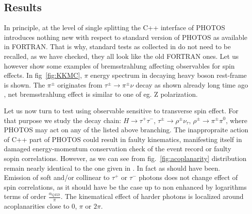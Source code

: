 \documentclass[]{Photos_interface_design}
\begin{document}
\subsection{Results}
In principle, at the level of single splitting the C++ interface of PHOTOS
introduces nothing new with respect to standard version of PHOTOS as available 
in FORTRAN. That is why, standard tests as collected in \cite{Photos_tests} do not need 
to be recalled, as we have checked, they all look like the old FORTRAN ones.
Let us however show some examples of bremsstrahlung affecting observables
for spin effects. In  fig~\ref{fig:KKMC}, $\pi$ energy spectrum in decaying
heavy boson rest-frame is shown. The $\pi^\pm$ originates from $\tau^\pm \to \pi^\pm \nu $ decay as shown already long time ago \cite{Boillot:1988re}, net
bremsstrahlung  effect is similar 
to one of eg. Z polarization.

Let us now turn to test using observable sensitive to transverse spin effect.
 For that purpose we study the decay chain:
$H\to \tau^+\tau^-$, $\tau^\pm \to \rho^\pm \nu_\tau$, 
$\rho^\pm \to \pi^\pm \pi^0$, where PHOTOS may act on any of the listed above branching. The inappropraite action of C++ part of PHOTOS could result in faulty
kinematics, manifesting itself in damaged energy-momentum conservation check of the event record or faulty sopin correlations. However, as we can see from 
fig.~\ref{fig:acoplanarity} distribution remain nearly identical to the 
one given in \cite{tauolaC++}. In fact as should have been. Emission of soft
and/or collinear to $\tau^+$ or $\tau^-$ photons does not change effect of 
spin correlations, as it should have be the case up to non enhanced by logarithms terms of order $\frac{\alpha_{QED}}{\pi}$. The kinematical effect of harder 
photons is localized around acoplanarities close to $0$, $\pi$ or $2\pi$. 
\end{document}
